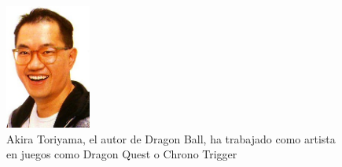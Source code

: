 \begin{figure}[h]
    \centering
    \includegraphics[width=0.25\textwidth]{images/estadodelarte/desarrollo/akira-toriyama}
    \caption{Akira Toriyama, el autor de Dragon Ball, ha trabajado como artista en juegos como Dragon Quest o Chrono Trigger}
\end{figure}

